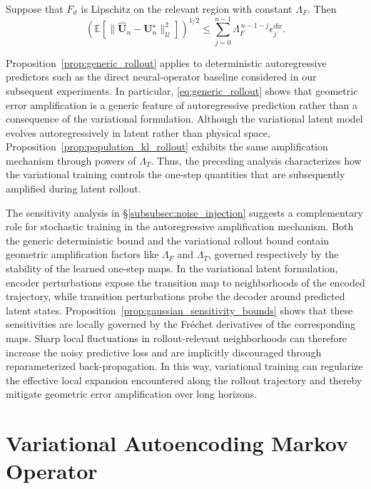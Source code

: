 \documentclass[11pt]{article}
\begin{document}
\begin{proposition}
\label{prop:generic_rollout}
Suppose that $F_\vartheta$ is Lipschitz on the relevant region with constant
$\Lambda_F$. Then
\begin{equation}
\left(
\mathbb E
\left[\|\widehat{\mathbf U}_n-\mathbf U_n^\star\|_{\mathcal U}^2
\right]\right)^{1/2}
\leq\sum_{j=0}^{n-1}\Lambda_F^{\,n-1-j}\epsilon_j^{\mathrm{dir}}.
\label{eq:generic_rollout}
\end{equation}
\end{proposition}

Proposition~\ref{prop:generic_rollout} applies to deterministic autoregressive predictors such as the direct neural-operator baseline considered in our subsequent experiments. In particular, \eqref{eq:generic_rollout} shows that geometric error amplification is a generic feature of autoregressive prediction rather than a consequence of the variational formulation. Although the variational latent model evolves autoregressively in latent rather than physical space, Proposition~\ref{prop:population_kl_rollout} exhibits the same amplification mechanism through powers of $\Lambda_T$. Thus, the preceding analysis characterizes how the variational training  controls the one-step quantities that are subsequently amplified during latent rollout.

The sensitivity analysis in \S\ref{subsubsec:noise_injection} suggests a complementary role for stochastic training in the autoregressive amplification mechanism. Both the generic deterministic bound and the variational rollout bound contain geometric amplification factors like $\Lambda_F$ and $\Lambda_T$, governed respectively by the stability of the learned one-step maps. In the variational latent formulation, encoder perturbations expose the transition map to neighborhoods of the encoded trajectory, while transition perturbations probe the decoder around predicted latent states. Proposition~\ref{prop:gaussian_sensitivity_bounds} shows that these sensitivities are locally governed by the Fréchet derivatives of the corresponding maps. Sharp local fluctuations in rollout-relevant neighborhoods can therefore increase the noisy predictive loss and are implicitly discouraged through reparameterized back-propagation. In this way, variational training can regularize the effective local expansion encountered along the rollout trajectory and thereby mitigate geometric error amplification over long horizons.


\section{Variational Autoencoding Markov Operator}
\label{sec:vamo}
\end{document}
